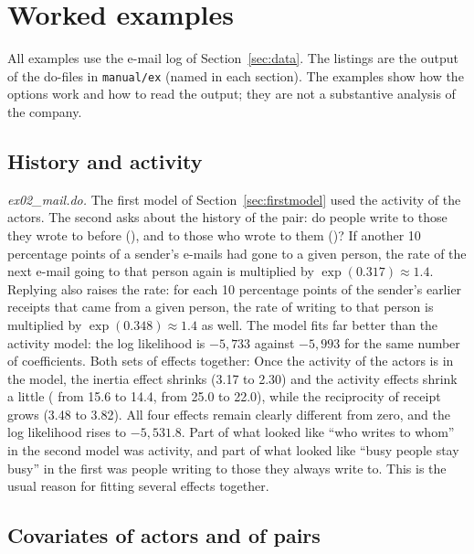 \chapter{Worked examples}\label{ch:examples}

All examples use the e-mail log of Section~\ref{sec:data}. The listings are the output of the do-files in \texttt{manual/ex} (named in each section). The examples show how the options work and how to read the output; they are not a substantive analysis of the company.

\section{History and activity}\label{sec:ex-history}

\emph{ex02\_mail.do.} The first model of Section~\ref{sec:firstmodel} used the activity of the actors. The second asks about the history of the pair: do people write to those they wrote to before (), and to those who wrote to them ()?
If another 10 percentage points of a sender's e-mails had gone to a given person, the rate of the next e-mail going to that person again is multiplied by $\exp(0.317)\approx 1.4$. Replying also raises the rate: for each 10 percentage points of the sender's earlier receipts that came from a given person, the rate of writing to that person is multiplied by $\exp(0.348)\approx 1.4$ as well. The model fits far better than the activity model: the log likelihood is $-5{,}733$ against $-5{,}993$ for the same number of coefficients. Both sets of effects together:
Once the activity of the actors is in the model, the inertia effect shrinks (3.17 to 2.30) and the activity effects shrink a little ( from 15.6 to 14.4,  from 25.0 to 22.0), while the reciprocity of receipt grows (3.48 to 3.82). All four effects remain clearly different from zero, and the log likelihood rises to $-5{,}531.8$. Part of what looked like ``who writes to whom'' in the second model was activity, and part of what looked like ``busy people stay busy'' in the first was people writing to those they always write to. This is the usual reason for fitting several effects together.

\section{Covariates of actors and of pairs}\label{sec:ex-cov}

